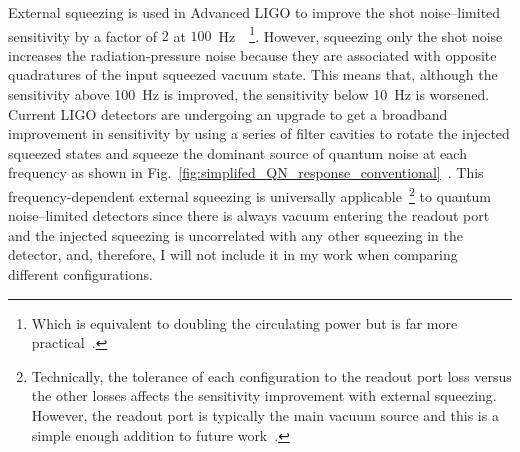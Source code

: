 External squeezing is used in Advanced LIGO to improve the shot noise--limited sensitivity by a factor of $2$ at $100$~Hz~\cite{tseQuantumEnhancedAdvancedLIGO2019}~\footnote{Which is equivalent to doubling the circulating power but is far more practical~\cite{}.}.
However, squeezing only the shot noise increases the radiation-pressure noise because they are associated with opposite quadratures of the input squeezed vacuum state. %
This means that, although the sensitivity above 100~Hz is improved, the sensitivity below 10~Hz is worsened.
Current LIGO detectors are undergoing an upgrade to get a broadband improvement in sensitivity by using a series of filter cavities to rotate the injected squeezed states and squeeze the dominant source of quantum noise at each frequency as shown in Fig.~\ref{fig:simplifed_QN_response_conventional}~\cite{LIGOFilterCavitypaperLeeMcCulleretal}.
This frequency-dependent external squeezing is universally applicable~\footnote{Technically, the tolerance of each configuration to the readout port loss versus the other losses affects the sensitivity improvement with external squeezing. However, the readout port is typically the main vacuum source and this is a simple enough addition to future work~\cite{}.} to quantum noise--limited detectors since there is always vacuum entering the readout port and the injected squeezing is uncorrelated with any other squeezing in the detector, and, therefore, I will not include it in my work when comparing different configurations. %


